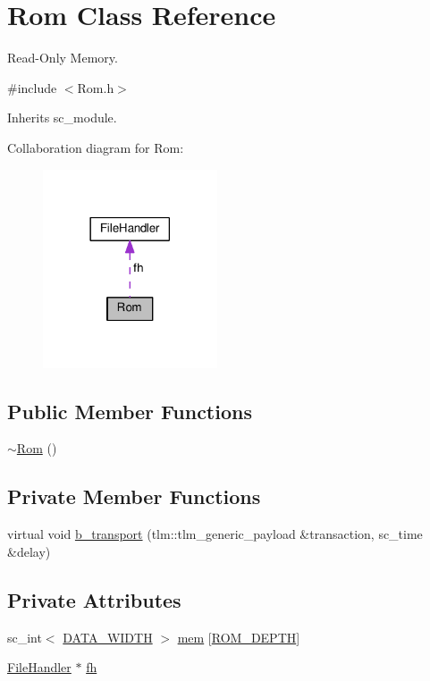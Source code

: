 \hypertarget{classRom}{\section{Rom Class Reference}
\label{classRom}
}


Read-\/\+Only Memory.  




{\ttfamily \#include $<$Rom.\+h$>$}



Inherits sc\+\_\+module.



Collaboration diagram for Rom\+:\nopagebreak
\begin{figure}[H]
\begin{center}
\leavevmode
\includegraphics[width=146pt]{classRom__coll__graph}
\end{center}
\end{figure}
\subsection*{Public Member Functions}
\begin{DoxyCompactItemize}
\item 
\hyperlink{classRom_a7ae10e2c40489fc7e5727694dab3e906}{$\sim$\+Rom} ()
\end{DoxyCompactItemize}
\subsection*{Private Member Functions}
\begin{DoxyCompactItemize}
\item 
virtual void \hyperlink{classRom_a427f623e435adbff5e49bfc42018ee17}{b\+\_\+transport} (tlm\+::tlm\+\_\+generic\+\_\+payload \&transaction, sc\+\_\+time \&delay)
\end{DoxyCompactItemize}
\subsection*{Private Attributes}
\begin{DoxyCompactItemize}
\item 
sc\+\_\+int$<$ \hyperlink{Defines_8h_af087b76f9707be9d3b43ba0c782c31c3}{D\+A\+T\+A\+\_\+\+W\+I\+D\+T\+H} $>$ \hyperlink{classRom_aed8f55c20e5ba447c9d312b6bac82dcd}{mem} \mbox{[}\hyperlink{Defines_8h_a3744909059435c19ead1ff15e0fb3257}{R\+O\+M\+\_\+\+D\+E\+P\+T\+H}\mbox{]}
\item 
\hyperlink{classFileHandler}{File\+Handler} $\ast$ \hyperlink{classRom_ad7d70385f6cd68a97c89c48f4590cbb1}{fh}
\end{DoxyCompactItemize}


